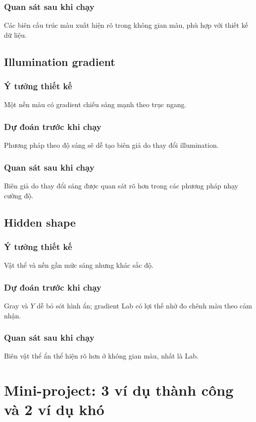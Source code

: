 \documentclass[12pt,a4paper]{article}
\begin{document}
\subsubsection{Quan sát sau khi chạy}
Các biên cấu trúc màu xuất hiện rõ trong không gian màu, phù hợp với thiết kế dữ liệu.

\subsection{Illumination gradient}
\subsubsection{Ý tưởng thiết kế}
Một nền màu có gradient chiếu sáng mạnh theo trục ngang.

\subsubsection{Dự đoán trước khi chạy}
Phương pháp theo độ sáng sẽ dễ tạo biên giả do thay đổi illumination.

\subsubsection{Quan sát sau khi chạy}
Biên giả do thay đổi sáng được quan sát rõ hơn trong các phương pháp nhạy cường độ.

\subsection{Hidden shape}
\subsubsection{Ý tưởng thiết kế}
Vật thể và nền gần mức sáng nhưng khác sắc độ.

\subsubsection{Dự đoán trước khi chạy}
Gray và $Y$ dễ bỏ sót hình ẩn; gradient Lab có lợi thế nhờ đo chênh màu theo cảm nhận.

\subsubsection{Quan sát sau khi chạy}
Biên vật thể ẩn thể hiện rõ hơn ở không gian màu, nhất là Lab.

\section{Mini-project: 3 ví dụ thành công và 2 ví dụ khó}
\end{document}
